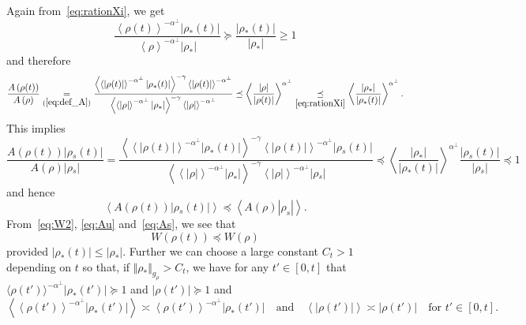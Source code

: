 \documentclass[10pt]{amsart}
\theoremstyle{definition}\newtheorem{defi}[theo]{Definition}\newtheorem{rema}[theo]{Remark}\newtheorem{exam}[theo]{Example}\newtheorem{exem}[theo]{Example}\newtheorem{nota}[theo]{Notation}
\newcommand*\eq[1]{\underset{(#1)}{=}}
\begin{document}
Again from~\eqref{eq:rationXi}, we get
\[
\frac{\left\langle \rho(t)\right\rangle ^{-\alpha^{\perp}}\left|\rho_{*}(t)\right|}{\left\langle \rho\right\rangle ^{-\alpha^{\perp}}\left|\rho_{*}\right|}\succeq\frac{\left|\rho_{*}(t)\right|}{\left|\rho_{*}\right|}\ge1
\]
and therefore
\[
\frac{A\left(\rho(t)\right)}{A\left(\rho\right)}\eq{\ref{eq:def_A}}\frac{\left\langle \left\langle \left|\rho(t)\right|\right\rangle ^{-\alpha^{\perp}}\left|\rho_{*}(t)\right|\right\rangle ^{-\gamma}\left\langle \left|\rho(t)\right|\right\rangle ^{-\alpha^{\perp}}}{\left\langle \left\langle \left|\rho\right|\right\rangle ^{-\alpha^{\perp}}\left|\rho_{*}\right|\right\rangle ^{-\gamma}\left\langle \left|\rho\right|\right\rangle ^{-\alpha^{\perp}}}\preceq\left\langle \frac{\left|\rho\right|}{\left|\rho(t)\right|}\right\rangle ^{\alpha^{\perp}}\underset{\eqref{eq:rationXi}}{\preceq}\left\langle \frac{\left|\rho_{*}\right|}{\left|\rho_{*}(t)\right|}\right\rangle ^{\alpha^{\perp}}.
\]
This implies
\[
\frac{A\left(\rho(t)\right)\left|\rho{}_{s}(t)\right|}{A\left(\rho\right)\left|\rho{}_{s}\right|}=\frac{\left\langle \left\langle \left|\rho(t)\right|\right\rangle ^{-\alpha^{\perp}}\left|\rho_{*}(t)\right|\right\rangle ^{-\gamma}\left\langle \left|\rho(t)\right|\right\rangle ^{-\alpha^{\perp}}\left|\rho{}_{s}(t)\right|}{\left\langle \left\langle \left|\rho\right|\right\rangle ^{-\alpha^{\perp}}\left|\rho_{*}\right|\right\rangle ^{-\gamma}\left\langle \left|\rho\right|\right\rangle ^{-\alpha^{\perp}}\left|\rho{}_{s}\right|}\preceq\left\langle \frac{\left|\rho_{*}\right|}{\left|\rho_{*}(t)\right|}\right\rangle ^{\alpha^{\perp}}\frac{\left|\rho{}_{s}(t)\right|}{\left|\rho{}_{s}\right|}\preceq1
\]
and hence
\begin{equation}\label{eq:As}
\left\langle A\left(\rho(t)\right)\left|\rho{}_{s}(t)\right|\right\rangle \preceq\left\langle A\left(\rho\right)\left|\rho_{s}\right|\right\rangle.
\end{equation}
From~\eqref{eq:W2}, \eqref{eq:Au} and~\eqref{eq:As}, we see that
\[
W\left(\rho(t)\right)\preceq W\left(\rho\right)
\]
provided $|\rho_{*}(t)|\leq|\rho_{*}|$. Further we can choose a large constant $C_{t}>1$ depending on $t$ so that, if $\Vert \rho_{*}\Vert _{g_{\rho}}>C_{t}$, we have for any $t'\in[0,t]$ that $\langle \rho(t')\rangle ^{-\alpha^{\perp}}|\rho_{*}(t')|\succeq1$ and $|\rho(t')|\succeq1$ and
\[
\left\langle \left\langle \rho(t')\right\rangle ^{-\alpha^{\perp}}\left|\rho_{*}(t')\right|\right\rangle \asymp\left\langle \rho(t')\right\rangle ^{-\alpha^{\perp}}\left|\rho_{*}(t')\right|\quad\text{and}\quad\left\langle \left|\rho(t')\right|\right\rangle \asymp\left|\rho(t')\right|\quad\text{for }t'\in\left[0,t\right].
\]
\end{document}
